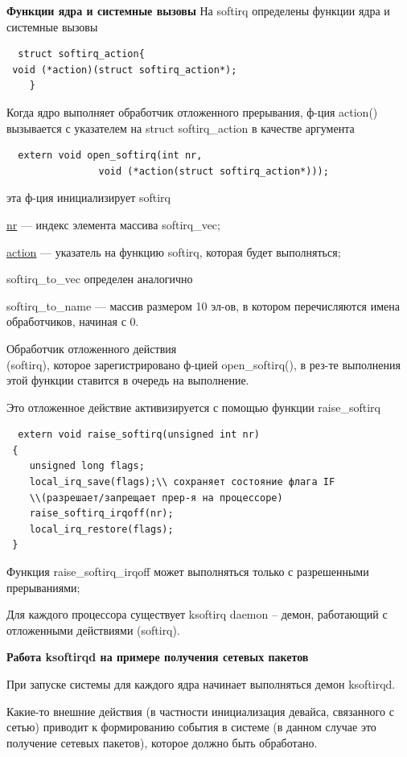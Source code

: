 \textbf{Функции ядра и системные вызовы}
На softirq определены функции ядра и системные вызовы
\begin{lstlisting}
  struct softirq_action{
 void (*action)(struct softirq_action*);
    }
\end{lstlisting}

Когда ядро выполняет обработчик отложенного прерывания, ф-ция action() вызывается с указателем на struct
softirq\_action в качестве аргумента

\begin{lstlisting}
  extern void open_softirq(int nr, 
                void (*action(struct softirq_action*)));
\end{lstlisting}
эта ф-ция инициализирует softirq

\underline{nr} --- индекс элемента массива softirq\_vec;

\underline{action} --- указатель на функцию softirq, которая будет выполняться;

softirq\_to\_vec определен аналогично

softirq\_to\_name --- массив размером 10 эл-ов, в котором перечисляются имена обработчиков, начиная с 0.

Обработчик отложенного действия \\  (softirq), которое зарегистрировано ф-цией open\_softirq(), в рез-те выполнения этой функции ставится в очередь на выполнение.

Это отложенное действие активизируется с помощью функции raise\_softirq
\begin{lstlisting}
  extern void raise_softirq(unsigned int nr)
 {
    unsigned long flags;
    local_irq_save(flags);\\ сохраняет состояние флага IF
    \\(разрешает/запрещает прер-я на процессоре)
    raise_softirq_irqoff(nr);
    local_irq_restore(flags);
 }
\end{lstlisting}

Функция raise\_softirq\_irqoff может выполняться только с разрешенными прерываниями;

Для каждого процессора существует ksoftirq daemon -- демон, работающий с отложенными действиями (softirq).

\textbf{Работа ksoftirqd на примере получения сетевых пакетов}

При запуске системы для каждого ядра начинает выполняться демон ksoftirqd.

Какие-то внешние действия (в частности инициализация девайса, связанного с сетью) приводит к формированию события в системе (в данном случае это получение сетевых пакетов), которое должно быть обработано.


